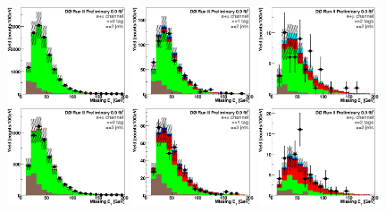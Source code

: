 \begin{figure}[!h!tbp]
\begin{center}
\includegraphics[width=0.32\textwidth]{eps/DataBackground/EMU/emu_EqZeroTag_EqTwoJet_MissingEt.eps}
\includegraphics[width=0.32\textwidth]{eps/DataBackground/EMU/emu_EqOneTag_EqTwoJet_MissingEt.eps}
\includegraphics[width=0.32\textwidth]{eps/DataBackground/EMU/emu_EqTwoTag_EqTwoJet_MissingEt.eps}
\includegraphics[width=0.32\textwidth]{eps/DataBackground/EMU/emu_EqZeroTag_EqThreeJet_MissingEt.eps}
\includegraphics[width=0.32\textwidth]{eps/DataBackground/EMU/emu_EqOneTag_EqThreeJet_MissingEt.eps}
\includegraphics[width=0.32\textwidth]{eps/DataBackground/EMU/emu_EqTwoTag_EqThreeJet_MissingEt.eps}

\end{center}
\end{figure}

